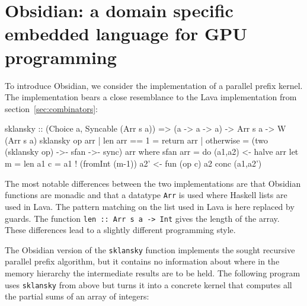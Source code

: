 
\section{Obsidian: a domain specific embedded language for GPU programming}
\label{sec:obsidian}

To introduce Obsidian, we consider the implementation of a parallel prefix 
kernel. The implementation bears a close resemblance to the Lava implementation 
from section~\ref{sec:combinators}:

                                   


\begin{code}
sklansky :: (Choice a, Syncable (Arr s a)) => 
             (a -> a -> a) -> Arr s a -> W (Arr s a) 
sklansky op arr 
   | len arr == 1 = return arr
   | otherwise = (two (sklansky op) ->- sfan ->- sync) arr
    where sfan arr = do 
            (a1,a2) <- halve arr
            let m = len a1
                c = a1 ! (fromInt (m-1))
            a2' <- fun (op c) a2
            conc (a1,a2')

\end{code}
The most notable differences between the two implementations are that Obsidian 
functions are monadic and that a datatype {\tt Arr} is used where Haskell lists
are used in Lava. The pattern matching on the list used in Lava is here 
replaced by guards. The function {\tt len :: Arr s a -> Int} gives the 
length of the array. These differences lead to a slightly different programming
style.


The Obsidian version of the {\tt sklansky} function implements the sought
recursive parallel prefix algorithm, but it 
contains no information about where in the memory hierarchy the intermediate
results are to be held. The following program uses {\tt sklansky} from 
above but turns it into a concrete kernel that computes all the partial sums
of an array of integers: 

